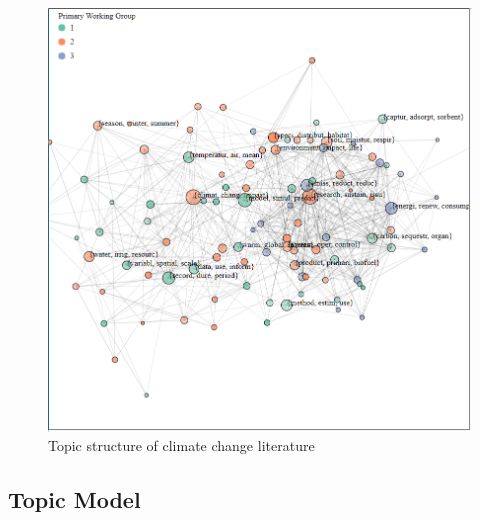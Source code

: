 \documentclass{article}
\begin{document}
\begin{figure}
\begin{center}
	\includegraphics[width=0.7\linewidth]{plots/network_wg_65}
    \caption{Topic structure of climate change literature}
    \label{network}
    \end{center}
\end{figure}

\subsection*{Topic Model}
\end{document}
